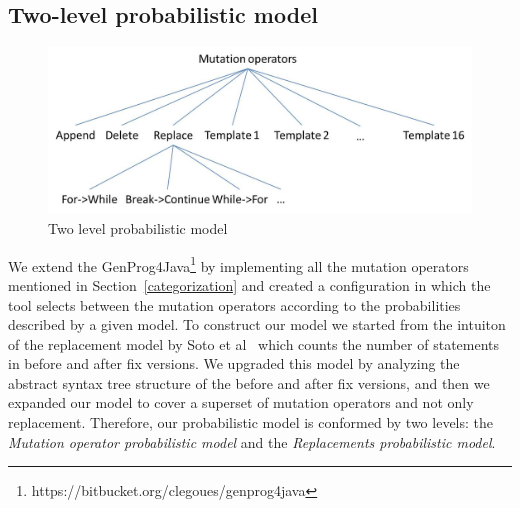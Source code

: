 \documentclass[conference]{IEEEtran}
\begin{document}



\subsection{Two-level probabilistic model}

\begin{figure}[!h]
  \centering
    \includegraphics[scale=0.4]{Picture2}
  \caption{Two level probabilistic model}
  \label{fig:probModel}
\end{figure}

We extend the GenProg4Java\footnote{https://bitbucket.org/clegoues/genprog4java}
by implementing all the mutation operators mentioned in
Section~\ref{categorization} and created a configuration in which the tool 
selects between the mutation operators according to the probabilities described by
a given model. To construct our model we started from the intuiton of the replacement model by Soto et al~\cite{Soto15} which counts the number of statements in before and after fix versions. We upgraded this model by analyzing the abstract syntax tree structure of the before and after fix versions, and then we expanded our model to cover a superset of mutation operators and not only replacement. Therefore, our probabilistic model is conformed by two levels: the 
\textit{Mutation operator probabilistic model} and 
the \textit{Replacements probabilistic model}.
\end{document}
